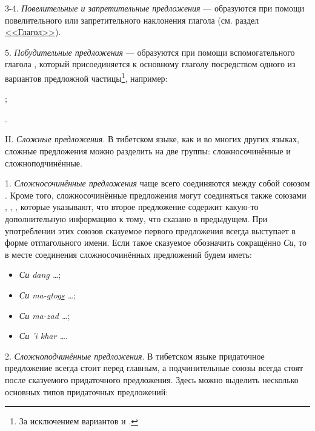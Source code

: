 3-4. \emph{Повелительные и запретительные предложения} --- образуются при помощи повелительного или запретительного наклонения глагола (см. раздел \hyperref[sec:glagol]{<<Глагол>>}).

5. \emph{Побудительные предложения} --- образуются при помощи вспомогательного глагола , который присоединяется к основному глаголу посредством одного из вариантов предложной частицы\footnote[53]{За исключением вариантов  и .}, например:
\begin{prfsample}
	\item {};
	\item {}.
\end{prfsample}

II. \label{sec:sintaks:slozhn}\emph{Сложные предложения}. В тибетском языке, как и во многих других языках, сложные предложения можно разделить на две группы: сложносочинённые и сложноподчинённые.

1. \emph{Сложносочинённые предложения} чаще всего соединяются между собой союзом . Кроме того, сложносочинённые предложения могут соединяться также союзами , , , которые указывают, что второе предложение содержит какую-то дополнительную информацию к тому, что сказано в предыдущем. При употреблении этих союзов сказуемое первого предложения всегда выступает в форме отглагольного имени. Если такое сказуемое обозначить сокращённо \emph{Си}, то в месте соединения сложносочинённых предложений будем иметь:
\begin{itemize}
	\item \emph{Си dang \ldots{}};
	\item \emph{Си ma-\ul{g}tog\ul{s} \ldots{}};
	\item \emph{Си ma-zad \ldots{}};
	\item \emph{Си 'i khar \ldots{}}.
\end{itemize}

2. \emph{Сложноподчинённые предложения}. В тибетском языке придаточное предложение всегда стоит перед главным, а подчинительные союзы всегда стоят после сказуемого придаточного предложения. Здесь можно выделить несколько основных типов придаточных предложений:


